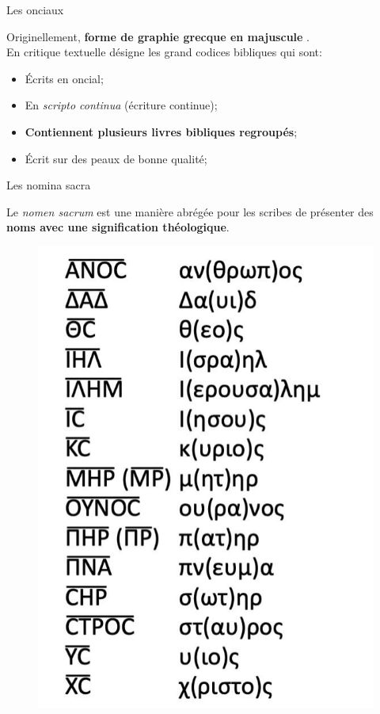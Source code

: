 \documentclass[11pt]{beamer}
\begin{document}
\begin{frame}{Les onciaux}

    Originellement, \textbf{forme de graphie grecque \og en majuscule \fg}.\\

    
    \pause
    En critique textuelle désigne les grand codices bibliques qui sont:
    \begin{block}{}
        \begin{itemize}
            \item Écrits en oncial;
            \item En \textit{scripto continua} (écriture continue);
            \item \textbf{Contiennent plusieurs livres bibliques regroupés};
            \item Écrit sur des peaux de bonne qualité;
        \end{itemize}
    \end{block}
\end{frame}


\begin{frame}{Les nomina sacra}
    \begin{alertblock}{}
        Le \emph{nomen sacrum} est une manière abrégée pour les scribes de présenter des \textbf{noms avec une signification théologique}.
    \end{alertblock}
\begin{figure}
    \centering
    \includegraphics[width=0.3\linewidth]{img/nomen_sacrum.png}
\end{figure}
    
\end{frame}
\end{document}
